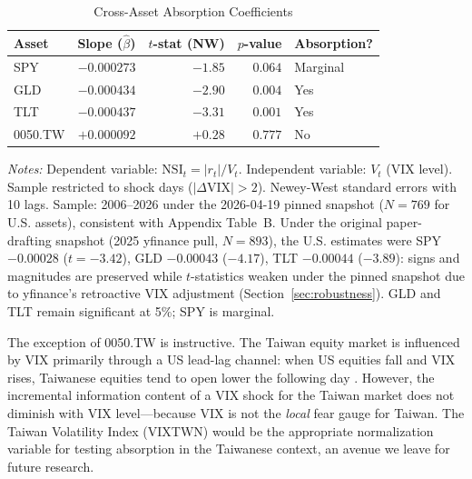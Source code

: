 \documentclass[12pt,a4paper]{article}
\begin{document}
\begin{table}[H]
\centering
\caption{Cross-Asset Absorption Coefficients}
\label{tab:cross_asset}
\begin{threeparttable}
\begin{tabular}{lrrrl}
\toprule
Asset & Slope ($\hat{\beta}$) & $t$-stat (NW) & $p$-value & Absorption? \\
\midrule
SPY     & $-0.000273$ & $-1.85$ & $0.064$ & Marginal \\
GLD     & $-0.000434$ & $-2.90$ & $0.004$ & Yes \\
TLT     & $-0.000437$ & $-3.31$ & $0.001$ & Yes \\
0050.TW & $+0.000092$ & $+0.28$ & $0.777$   & No  \\ %
\bottomrule
\end{tabular}
\begin{tablenotes}
\small
\item \textit{Notes:} Dependent variable: $\text{NSI}_t = |r_t| / V_t$. Independent variable: $V_t$ (VIX level). Sample restricted to shock days ($|\Delta\text{VIX}| > 2$). Newey-West standard errors with 10 lags. Sample: 2006--2026 under the 2026-04-19 pinned snapshot ($N = 769$ for U.S. assets), consistent with Appendix Table~B. Under the original paper-drafting snapshot (2025 yfinance pull, $N = 893$), the U.S. estimates were SPY $-0.00028$ ($t=-3.42$), GLD $-0.00043$ ($-4.17$), TLT $-0.00044$ ($-3.89$): signs and magnitudes are preserved while $t$-statistics weaken under the pinned snapshot due to yfinance's retroactive VIX adjustment (Section~\ref{sec:robustness}). GLD and TLT remain significant at 5\%; SPY is marginal.
\end{tablenotes}
\end{threeparttable}
\end{table}

The exception of 0050.TW is instructive. The Taiwan equity market is influenced by VIX primarily through a US lead-lag channel: when US equities fall and VIX rises, Taiwanese equities tend to open lower the following day \citep{lin2020}. However, the incremental information content of a VIX shock for the Taiwan market does not diminish with VIX level---because VIX is not the \textit{local} fear gauge for Taiwan. The Taiwan Volatility Index (VIXTWN) would be the appropriate normalization variable for testing absorption in the Taiwanese context, an avenue we leave for future research.
\end{document}
